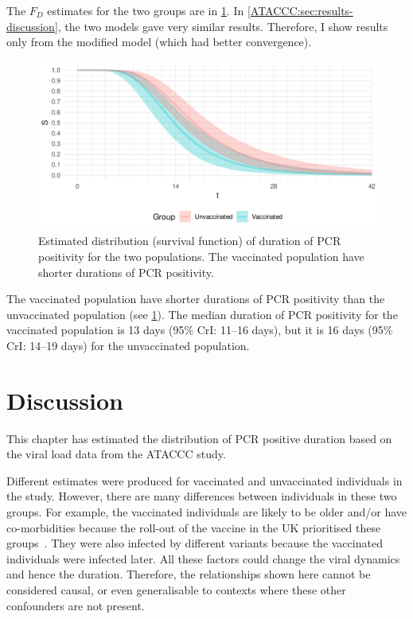 \documentclass[thesis.tex]{subfiles}
\begin{document}
The $F_D$ estimates for the two groups are in \cref{ATACCC:fig:duration}.
In \cref{ATACCC:sec:results-discussion}, the two models gave very similar results.
Therefore, I show results only from the modified model (which had better convergence).
\begin{figure}
  \centering \includegraphics{ATACCC/duration}
  \caption[Duration of PCR positivity.]{Estimated distribution (survival function) of duration of PCR positivity for the two populations. The vaccinated population have shorter durations of PCR positivity.  \label{ATACCC:fig:duration}}
\end{figure}

The vaccinated population have shorter durations of PCR positivity than the unvaccinated population (see \cref{ATACCC:fig:duration}).
The median duration of PCR positivity for the vaccinated population is 13 days (95\% CrI: 11--16 days), but it is 16 days (95\% CrI: 14--19 days) for the unvaccinated population.

\section{Discussion}

This chapter has estimated the distribution of PCR positive duration based on the viral load data from the ATACCC study.

Different estimates were produced for vaccinated and unvaccinated individuals in the study.
However, there are many differences between individuals in these two groups.
For example, the vaccinated individuals are likely to be older and/or have co-morbidities because the roll-out of the vaccine in the UK prioritised these groups~\autocite{naoCovidVaccination}.
They were also infected by different variants because the vaccinated individuals were infected later.
All these factors could change the viral dynamics~\autocite{russellWithinhost} and hence the duration.
Therefore, the relationships shown here cannot be considered causal, or even generalisable to contexts where these other confounders are not present.
\end{document}
